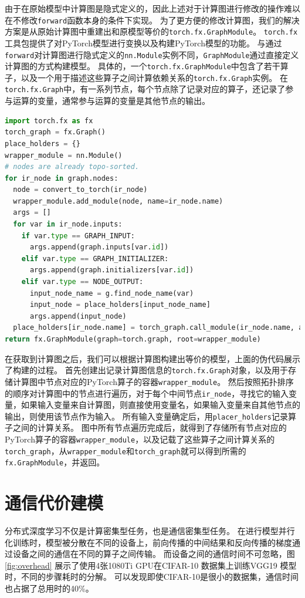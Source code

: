 由于在原始模型中计算图是隐式定义的，因此上述对于计算图进行修改的操作难以在不修改\texttt{forward}函数本身的条件下实现。
为了更方便的修改计算图，我们的解决方案是从原始计算图中重建出和原模型等价的\texttt{torch.fx.GraphModule}。
\texttt{torch.fx}  工具包提供了对PyTorch模型进行变换以及构建PyTorch模型的功能。
与通过\texttt{forward}对计算图进行隐式定义的\texttt{nn.Module}实例不同，\texttt{GraphModule}通过直接定义计算图的方式构建模型。
具体的，一个\texttt{torch.fx.GraphModule}中包含了若干算子，以及一个用于描述这些算子之间计算依赖关系的\texttt{torch.fx.Graph}实例。
在\texttt{torch.fx.Graph}中，有一系列节点，每个节点除了记录对应的算子，还记录了参与运算的变量，通常参与运算的变量是其他节点的输出。

\begin{lstlisting}[language=Python, caption={模型重建}]
import torch.fx as fx 
torch_graph = fx.Graph() 
place_holders = {}
wrapper_module = nn.Module()
# nodes are already topo-sorted.
for ir_node in graph.nodes:
  node = convert_to_torch(ir_node)
  wrapper_module.add_module(node, name=ir_node.name)
  args = []
  for var in ir_node.inputs:
    if var.type == GRAPH_INPUT:
	  args.append(graph.inputs[var.id])
	elif var.type == GRAPH_INITIALIZER:
      args.append(graph.initializers[var.id])
	elif var.type == NODE_OUTPUT:
	  input_node_name = g.find_node_name(var)
	  input_node = place_holders[input_node_name]
	  args.append(input_node)
  place_holders[ir_node.name] = torch_graph.call_module(ir_node.name, args)
return fx.GraphModule(graph=torch.graph, root=wrapper_module)
\end{lstlisting}

在获取到计算图之后，我们可以根据计算图构建出等价的模型，上面的伪代码展示了构建的过程。
首先创建出记录计算图信息的\texttt{torch.fx.Graph}对象，以及用于存储计算图中节点对应的PyTorch算子的容器\texttt{wrapper\_module}。
然后按照拓扑排序的顺序对计算图中的节点进行遍历，对于每个中间节点\texttt{ir\_node}，寻找它的输入变量，如果输入变量来自计算图，则直接使用变量名，如果输入变量来自其他节点的输出，则使用该节点作为输入。
所有输入变量确定后，用\texttt{placer\_holders}记录算子之间的计算关系。
图中所有节点遍历完成后，就得到了存储所有节点对应的PyTorch算子的容器\texttt{wrapper\_module}，以及记载了这些算子之间计算关系的\texttt{torch\_graph}，从\texttt{wrapper\_module}和\texttt{torch\_graph}就可以得到所需的\texttt{fx.GraphModule}，并返回。

\section{通信代价建模}
\label{sec:commu}
分布式深度学习不仅是计算密集型任务，也是通信密集型任务。
在进行模型并行化训练时，模型被分散在不同的设备上，前向传播的中间结果和反向传播的梯度通过设备之间的通信在不同的算子之间传输。
而设备之间的通信时间不可忽略，图 \ref{fig:overhead} 展示了使用4张1080Ti GPU在CIFAR-10 数据集上训练VGG19 模型时，不同的步骤耗时的分解。
可以发现即使CIFAR-10是很小的数据集，通信时间也占据了总用时的40\%。

